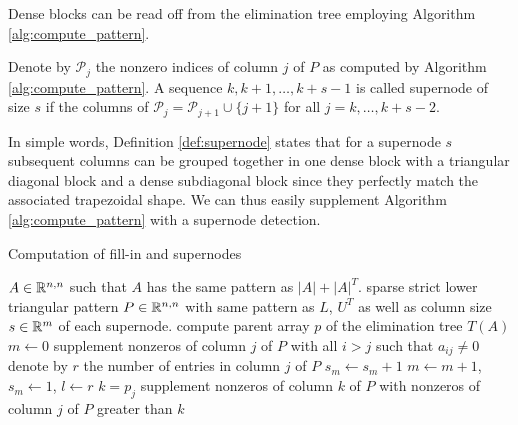 Dense blocks can be read off from the elimination tree employing
Algorithm \ref{alg:compute_pattern}.
\begin{definition}\label{def:supernode}
Denote by $\mathcal{P}_j$ the nonzero indices of column $j$ of $P$
as computed by Algorithm \ref{alg:compute_pattern}.
A sequence $k,k+1,\dots,k+s-1$ is called supernode of size $s$
if the columns of $\mathcal{P}_{j}=\mathcal{P}_{j+1}\cup \{j+1\}$
for all $j=k,\dots,k+s-2$.
\end{definition}
In simple words, Definition \ref{def:supernode} states that for a supernode
$s$ subsequent columns can be grouped together in one dense block with a triangular
diagonal block and a dense subdiagonal block since they perfectly match the 
associated trapezoidal shape. We can thus easily supplement 
Algorithm \ref{alg:compute_pattern} with a supernode detection.
\begin{programcode}{Computation of fill-in and supernodes}\label{alg:compute_supernode}
\begin{algorithmic}[1]
  \Require $A\in\mathbb{R}^{n,n}$ such that $A$ has the same pattern as $|A|+|A|^T$.
  \Ensure sparse strict lower triangular pattern $P\in\mathbb{R}^{n,n}$ with
  same pattern as $L$, $U^T$ as well as column size $s\in\mathbb{R}^m$ of each supernode.
  \State compute parent array $p$ of the elimination tree $T(A)$
  \State $m\leftarrow0$ 
      \State supplement nonzeros of column $j$ of $P$ with all $i>j$ such that $a_{ij}\not=0$ 
      \State denote by $r$ the number of entries in column $j$ of $P$
         \State $s_m\leftarrow s_m+1$ 
      \Else
         \State $m\leftarrow m+1$, $s_m\leftarrow 1$, $l\leftarrow r$ 
      \EndIf
      \State $k=p_j$
         \State supplement nonzeros of column $k$ of $P$ with nonzeros of column $j$ of $P$ greater than $k$
      \EndIf   
  \EndFor
\end{algorithmic}
\end{programcode}





